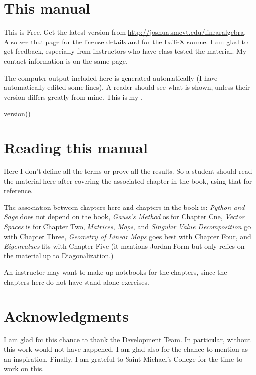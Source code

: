 \section{This manual}
This is Free.
Get the latest version from 
\url{http://joshua.smcvt.edu/linearalgebra}.
Also see that page for the license details and for 
the \LaTeX{} source.
I am glad to get feedback, especially from instructors
who have class-tested the material.
My contact information is on the same page. 

The computer output included here is generated automatically 
(I have automatically edited some lines).
A reader should see what is shown, unless their version differs
greatly from mine.
This is my \Sage.
\begin{sageoutput}[d,0,1]
version()  
\end{sageoutput}



\section{Reading this manual}
Here I don't define all the terms or prove all the results.
So a student should read the material here after covering the associated
chapter in the book, using that for reference.

The association between chapters here and chapters in the book is:
\textit{Python and Sage} does not depend on the
book,
\textit{Gauss’s Method} os for Chapter One,
\textit{Vector Spaces} is for Chapter Two,
\textit{Matrices}, 
\textit{Maps}, and 
\textit{Singular Value Decomposition} go with Chapter Three,
\textit{Geometry of Linear Maps} goes best with Chapter Four,
and \textit{Eigenvalues} fits with Chapter Five
(it mentions Jordan Form but only relies on the material up to 
Diagonalization.)

An instructor may want to make up \Sage{} notebooks for the chapters,
since the chapters here do not have stand-alone exercises.




\section{Acknowledgments}
I am glad for this chance to thank the \Sage{} Development Team.
In particular,
without \citep{SageTeam12ref} this work would not have happened.
I am glad also for the chance to mention 
\citep{Beezer11} as an inspiration.
Finally, I am grateful to Saint Michael's College for the time to work on this.






